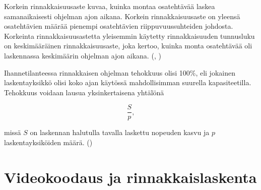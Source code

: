 Korkein rinnakkaisuusaste kuvaa, kuinka montaa osatehtävää laskea samanaikaisesti
ohjelman ajon aikana. Korkein rinnakkaisuusaste on yleensä osatehtävien määrää
pienempi osatehtävien riippuvuussuhteiden johdosta. Korkeinta
rinnakkaisuusastetta yleisemmin käytetty rinnakkaisuuden tunnusluku on
keskimääräinen rinnakkaisuusaste, joka kertoo, kuinka monta osatehtävää oli
laskennassa keskimäärin ohjelman ajon aikana. (\citealt{intro}, \citealt{rauber})

Ihannetilanteessa rinnakkaisen ohjelman tehokkuus olisi 100\%, eli jokainen
laskentayksikkö olisi koko ajan käytössä mahdollisimman suurella
kapasiteetilla. Tehokkuus voidaan lausua yksinkertaisena yhtälönä

\begin{center}
\begin{equation}\frac{S}{p},\end{equation}
\end{center}

missä $S$ on laskennan halutulla tavalla laskettu nopeuden kasvu ja $p$
laskentayksiköiden määrä. (\citealt{intro})

\section{Videokoodaus ja rinnakkaislaskenta}
\label{chap:parallel_coding}

